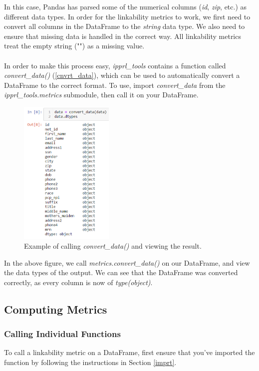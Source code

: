 \documentclass[titlepage, 11pt]{article}
\newcommand{\pkgname}{\textit{ipprl\_tools}}
\begin{document}
\noindent In this case, Pandas has parsed some of the numerical columns (\textit{id}, \textit{zip}, etc.) as different data types. In order for the linkability metrics to work, we first need to convert all columns in the DataFrame to the \textit{string} data type. We also need to ensure that missing data is handled in the correct way. All linkability metrics treat the empty string ("") as a missing value.
\\
\\
\noindent In order to make this process easy, \pkgname{} contains a function called \textit{convert\_data()} (\ref{cnvrt_data}), which can be used to automatically convert a DataFrame to the correct format. 
To use, import \textit{convert\_data} from the \pkgname\textit{.metrics} submodule, then call it on your DataFrame.

\begin{figure}[H]
    \centering
    \includegraphics[width=0.4\textwidth]{imgs/DtypesConverted.PNG}
    \caption{Example of calling \textit{convert\_data()} and viewing the result.}
    \label{fig:my_label}
\end{figure}

\noindent In the above figure, we call \textit{metrics.convert\_data()} on our DataFrame, and view the data types of the output. We can see that the DataFrame was converted correctly, as every column is now of \textit{type(object)}.
\\
\subsection{Computing Metrics}
\subsubsection{Calling Individual Functions}
To call a linkability metric on a DataFrame, first ensure that you've imported the function by following the instructions in Section \ref{imprt}.
\end{document}
